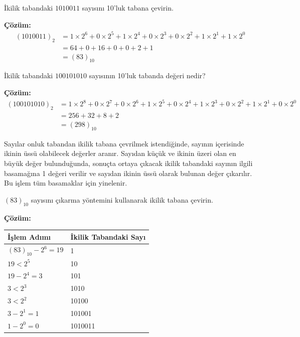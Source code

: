 \begin{ornek}[A.1]
İkilik tabandaki $1010011$ sayısını 10'luk tabana çevirin.

\textbf{Çözüm:}
\begin{align*}
(1010011)_2 &= 1\times 2^6 + 0\times 2^5 + 1\times 2^4 + 0\times 2^3 + 0\times 2^2 + 1\times 2^1 + 1\times 2^0 \\
&= 64 + 0 + 16 + 0 + 0 + 2 + 1 \\
&= (83)_{10}
\end{align*}
\end{ornek}

\begin{ornek}[A.2]
İkilik tabandaki $100101010$ sayısının 10'luk tabanda değeri nedir?

\textbf{Çözüm:}
\begin{align*}
(100101010)_2 &= 1\times 2^8 + 0\times 2^7 + 0\times 2^6 + 1\times 2^5 + 0\times 2^4 + 1\times 2^3 + 0\times 2^2 + 1\times 2^1 + 0\times 2^0 \\
&= 256 + 32 + 8 + 2 \\
&= (298)_{10}
\end{align*}
\end{ornek}

Sayılar onluk tabandan ikilik tabana çevrilmek istendiğinde, sayının içerisinde ikinin üssü olabilecek değerler aranır. Sayıdan küçük ve ikinin üzeri olan en büyük değer bulunduğunda, sonuçta ortaya çıkacak ikilik tabandaki sayının ilgili basamağına 1 değeri verilir ve sayıdan ikinin üssü olarak bulunan değer çıkarılır. Bu işlem tüm basamaklar için yinelenir.

\begin{ornek}[A.3]
$(83)_{10}$ sayısını çıkarma yöntemini kullanarak ikilik tabana çevirin.

\textbf{Çözüm:}

\begin{table}[H]
\centering
\begin{tabular}{ll}
\toprule
\textbf{İşlem Adımı} & \textbf{İkilik Tabandaki Sayı} \\
\midrule
$(83)_{10} - 2^6 = 19$ & 1 \\
$19 < 2^5$ & 10 \\
$19 - 2^4 = 3$ & 101 \\
$3 < 2^3$ & 1010 \\
$3 < 2^2$ & 10100 \\
$3 - 2^1 = 1$ & 101001 \\
$1 - 2^0 = 0$ & 1010011 \\
\bottomrule
\end{tabular}
\end{table}
\end{ornek}

